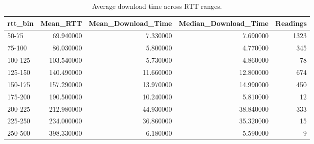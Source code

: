 \begin{table}
\caption{Average download time across RTT ranges.}
\label{tab:rtt_bins}
\begin{tabular}{lrrrr}
\toprule
rtt_bin & Mean_RTT & Mean_Download_Time & Median_Download_Time & Readings \\
\midrule
50-75 & 69.940000 & 7.330000 & 7.690000 & 1323 \\
75-100 & 86.030000 & 5.800000 & 4.770000 & 345 \\
100-125 & 103.540000 & 5.730000 & 4.860000 & 78 \\
125-150 & 140.490000 & 11.660000 & 12.800000 & 674 \\
150-175 & 157.290000 & 13.970000 & 14.990000 & 450 \\
175-200 & 190.500000 & 10.240000 & 5.810000 & 12 \\
200-225 & 212.980000 & 44.930000 & 38.840000 & 333 \\
225-250 & 234.000000 & 36.860000 & 35.320000 & 15 \\
250-500 & 398.330000 & 6.180000 & 5.590000 & 9 \\
\bottomrule
\end{tabular}
\end{table}
